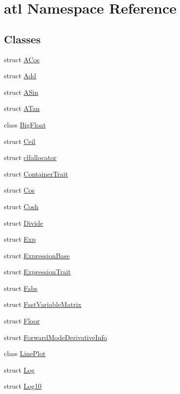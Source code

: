 \hypertarget{namespaceatl}{\section{atl Namespace Reference}
\label{namespaceatl}
}
\subsection*{Classes}
\begin{DoxyCompactItemize}
\item 
struct \hyperlink{structatl_1_1_a_cos}{A\+Cos}
\item 
struct \hyperlink{structatl_1_1_add}{Add}
\item 
struct \hyperlink{structatl_1_1_a_sin}{A\+Sin}
\item 
struct \hyperlink{structatl_1_1_a_tan}{A\+Tan}
\item 
class \hyperlink{classatl_1_1_big_float}{Big\+Float}
\item 
struct \hyperlink{structatl_1_1_ceil}{Ceil}
\item 
struct \hyperlink{structatl_1_1clfallocator}{clfallocator}
\item 
struct \hyperlink{structatl_1_1_container_trait}{Container\+Trait}
\item 
struct \hyperlink{structatl_1_1_cos}{Cos}
\item 
struct \hyperlink{structatl_1_1_cosh}{Cosh}
\item 
struct \hyperlink{structatl_1_1_divide}{Divide}
\item 
struct \hyperlink{structatl_1_1_exp}{Exp}
\item 
struct \hyperlink{structatl_1_1_expression_base}{Expression\+Base}
\item 
struct \hyperlink{structatl_1_1_expression_trait}{Expression\+Trait}
\item 
struct \hyperlink{structatl_1_1_fabs}{Fabs}
\item 
struct \hyperlink{structatl_1_1_fast_variable_matrix}{Fast\+Variable\+Matrix}
\item 
struct \hyperlink{structatl_1_1_floor}{Floor}
\item 
struct \hyperlink{structatl_1_1_forward_mode_derivative_info}{Forward\+Mode\+Derivative\+Info}
\item 
class \hyperlink{classatl_1_1_line_plot}{Line\+Plot}
\item 
struct \hyperlink{structatl_1_1_log}{Log}
\item 
struct \hyperlink{structatl_1_1_log10}{Log10}

\end{DoxyCompactItemize}
